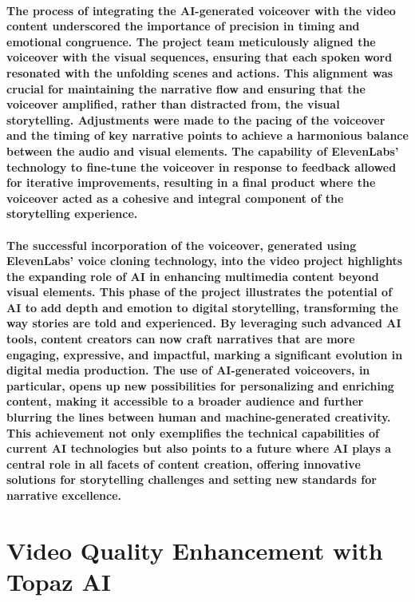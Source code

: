 \documentclass[11pt,a4paper,oneside]{report}
\begin{document}
\paragraph{The process of integrating the AI-generated voiceover with the video content underscored the importance of precision in timing and emotional congruence. The project team meticulously aligned the voiceover with the visual sequences, ensuring that each spoken word resonated with the unfolding scenes and actions. This alignment was crucial for maintaining the narrative flow and ensuring that the voiceover amplified, rather than distracted from, the visual storytelling. Adjustments were made to the pacing of the voiceover and the timing of key narrative points to achieve a harmonious balance between the audio and visual elements. The capability of ElevenLabs' technology to fine-tune the voiceover in response to feedback allowed for iterative improvements, resulting in a final product where the voiceover acted as a cohesive and integral component of the storytelling experience.}

\paragraph{The successful incorporation of the voiceover, generated using ElevenLabs' voice cloning technology, into the video project highlights the expanding role of AI in enhancing multimedia content beyond visual elements. This phase of the project illustrates the potential of AI to add depth and emotion to digital storytelling, transforming the way stories are told and experienced. By leveraging such advanced AI tools, content creators can now craft narratives that are more engaging, expressive, and impactful, marking a significant evolution in digital media production. The use of AI-generated voiceovers, in particular, opens up new possibilities for personalizing and enriching content, making it accessible to a broader audience and further blurring the lines between human and machine-generated creativity. This achievement not only exemplifies the technical capabilities of current AI technologies but also points to a future where AI plays a central role in all facets of content creation, offering innovative solutions for storytelling challenges and setting new standards for narrative excellence.}

\section{Video Quality Enhancement with Topaz AI}
\end{document}
